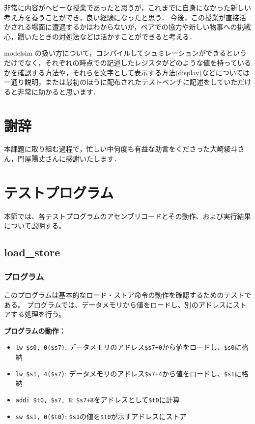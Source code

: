 \documentclass[dvipdfmx]{jsarticle}
\begin{document}
非常に内容がヘビーな授業であったと思うが，これまでに自身になかった新しい考え方を養うことができ，良い経験になったと思う．
今後，この授業が直接活かされる場面に遭遇するかはわからないが，ペアでの協力や新しい物事への挑戦心，躓いたときの対処法などは活かすことができると考える．

modelsim の扱い方について，コンパイルしてシュミレーションができるというだけでなく，それぞれの時点での記述したレジスタがどのような値を持っているかを確認する方法や，それらを文字として表示する方法(display)などについては一通り説明，または最初のほうに配布されたテストベンチに記述をしていただけると非常に助かると思います．


\section*{謝辞}
本課題に取り組む過程で，忙しい中何度も有益な助言をくださった大崎綾斗さん，門屋陽丈さんに感謝いたします．

\appendix
\section{テストプログラム}

本節では、各テストプログラムのアセンブリコードとその動作、および実行結果について説明する。

\subsection{load\_store}
\label{appendix:load_store}

\subsubsection{プログラム}
このプログラムは基本的なロード・ストア命令の動作を確認するためのテストである。
プログラムでは、データメモリから値をロードし、別のアドレスにストアする処理を行う。



\textbf{プログラムの動作：}
\begin{itemize}
\item \texttt{lw \$s0, 0(\$s7)}: データメモリのアドレス\texttt{\$s7+0}から値をロードし、\texttt{\$s0}に格納
\item \texttt{lw \$s1, 4(\$s7)}: データメモリのアドレス\texttt{\$s7+4}から値をロードし、\texttt{\$s1}に格納  
\item \texttt{addi \$t0, \$s7, 8}: \texttt{\$s7+8}をアドレスとして\texttt{\$t0}に計算
\item \texttt{sw \$s1, 0(\$t0)}: \texttt{\$s1}の値を\texttt{\$t0}が示すアドレスにストア
\end{itemize}
\end{document}
